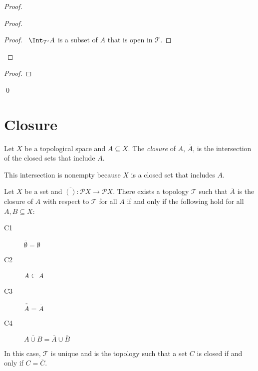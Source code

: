 \begin{proof}
  \pf
  \begin{proof}
    \begin{proof}
      \pf\ $\Int_{\mathcal{T}'} A$ is a subset of $A$ that is open in $\mathcal{T}$.
    \end{proof}
  \end{proof}
  \begin{proof}
  \end{proof}
  \qed
\end{proof}

\section{Closure}

\begin{df}[Closure]
  Let $X$ be a topological space and $A \subseteq X$.
  The \emph{closure} of $A$, $\overline{A}$, is the intersection of the closed sets that include $A$.

  This intersection is nonempty because $X$ is a closed set that includes $A$.
\end{df}

\begin{prop}
  \label{prop:closure}
Let $X$ be a set and $\overline{( )} : \mathcal{P} X \rightarrow \mathcal{P} X$. There exists a topology $\mathcal{T}$ such that
$\overline{A}$ is the closure of $A$ with respect to $\mathcal{T}$ for all $A$ if and only if the following hold for all $A, B \subseteq X$:
\begin{description}
  \item[C1]
  $\overline{\emptyset} = \emptyset$
  \item[C2]
  $A \subseteq \overline{A}$
  \item[C3]
  $\overline{\overline{A}} = \overline{A}$
  \item[C4]
  $\overline{A \cup B} = \overline{A} \cup \overline{B}$
\end{description}
In this case, $\mathcal{T}$ is unique and is the topology such that a set $C$ is closed if and only if $C = \overline{C}$.
\end{prop}

